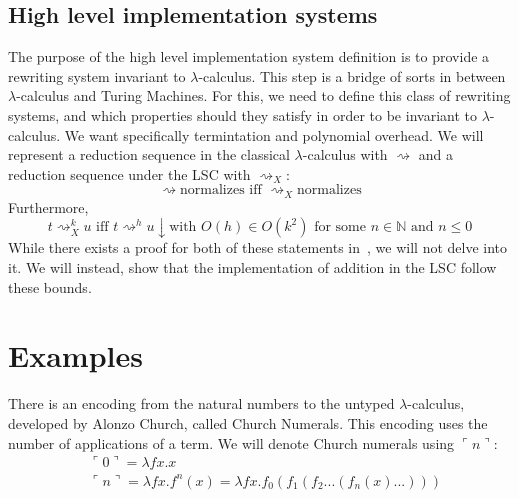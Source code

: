 \documentclass[11pt]{article}
\begin{document}
\subsection{High level implementation systems}
The purpose of the high level implementation system definition is to provide a rewriting system invariant to $\lambda$-calculus. This step is a bridge of sorts in between $\lambda$-calculus and Turing Machines. For this, we need to define this class of rewriting systems, and which properties should they satisfy in order to be invariant to $\lambda$-calculus. We want specifically termintation and polynomial overhead. We will represent a reduction sequence in the classical $\lambda$-calculus with $\rightsquigarrow$ and a reduction sequence under the LSC with $\rightsquigarrow_X$:
\[\rightsquigarrow \text{normalizes iff } {\rightsquigarrow}_{X} \text{normalizes}\]
Furthermore,
\[t {\rightsquigarrow}_{X}^k u \text{ iff } t {\rightsquigarrow}^h u\downarrow \text{with } O(h) \in O(k^2) \text{ for some } n \in \mathbb{N} \text{ and } n \leq 0 \]
While there exists a proof for both of these statements in~\cite{beta-invariance}, we will not delve into it. We will instead, show that the implementation of addition in the LSC follow these bounds.
\section{Examples}
There is an encoding from the natural numbers to the untyped $\lambda$-calculus, developed by Alonzo Church, called Church Numerals. This encoding uses the number of applications of a term. We will denote Church numerals using $\ulcorner n \urcorner$:
\begin{equation}
	\begin{split}
		& \ulcorner 0 \urcorner = \lambda f x . x \\
		& \ulcorner n \urcorner = \lambda f x . f^n (x) = \lambda f x . f_0 ( f_1 ( f_2 ... ( f_n ( x ) ... )))
	\end{split}
\end{equation}
\end{document}
